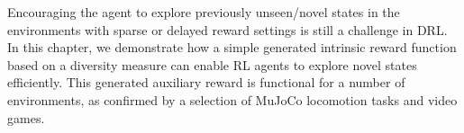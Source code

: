 
Encouraging the agent to explore previously unseen/novel states in the environments with sparse or delayed reward settings is still a challenge in DRL. In this chapter, we demonstrate how a simple generated intrinsic reward function based on a diversity measure can enable RL agents to explore novel states efficiently. This generated auxiliary reward is functional for a number of environments, as confirmed by a selection of MuJoCo locomotion tasks and video games.



